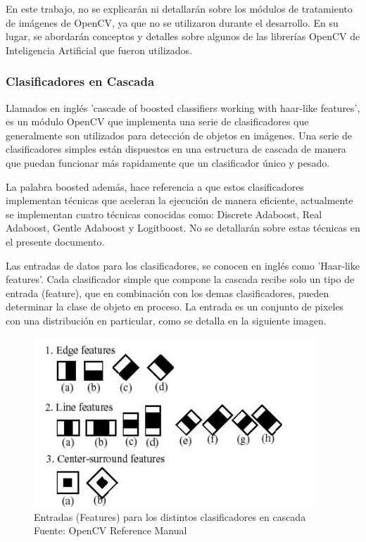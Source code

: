 \documentclass[a4paper,12pt,twoside]{article}
\begin{document}
En este trabajo, no se explicarán ni detallarán sobre los módulos de tratamiento de imágenes de OpenCV, ya que no se utilizaron durante el desarrollo. En su lugar, se abordarán conceptos y detalles sobre algunos de las librerías OpenCV de Inteligencia Artificial que fueron utilizados.\par

\subsubsection{Clasificadores en Cascada}

Llamados en inglés 'cascade of boosted classifiers working with haar-like features', es un módulo OpenCV que implementa una serie de clasificadores que generalmente son utilizados para detección de objetos en imágenes. Una serie de clasificadores simples están dispuestos en una estructura de cascada de manera que puedan funcionar más rapidamente que un clasificador único y pesado.  \par

La palabra boosted además, hace referencia a que estos clasificadores implementan técnicas que aceleran la ejecución de manera eficiente, actualmente se implementan cuatro técnicas conocidas como: Discrete Adaboost, Real Adaboost, Gentle Adaboost y Logitboost. No se detallarán sobre estas técnicas en el presente documento.\par

Las entradas de datos para los clasificadores, se conocen en inglés como 'Haar-like features'. Cada clasificador simple que compone la cascada recibe solo un tipo de entrada (feature), que en combinación con los demas clasificadores, pueden determinar la clase de objeto en proceso. La entrada es un conjunto de pixeles con una distribución en particular, como se detalla en la siguiente imagen.\par

\begin{figure}[h!]
	\includegraphics[width=300pt]{Imagenes/haarlike.jpg}
	\caption{Entradas (Features) para los distintos clasificadores en cascada Fuente: OpenCV Reference Manual}
	\label{fig:haarlike1}
\end{figure}
\end{document}
